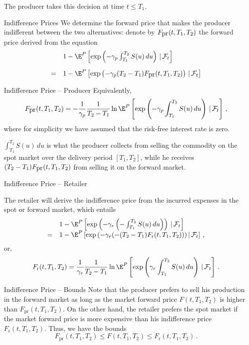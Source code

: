 The producer takes this decision at time $t\leq
T_1$.

{Indifference Prices}
We determine the forward price that makes the producer indifferent
between the two alternatives: denote by $F_{\hbox{pr}}(t,T_1,T_2)$
the forward price derived from the equation
$$
\begin{array}{ll}

& 1-\E^P\left[\exp\left(-\gamma_p\int_{T_1}^{T_2}S(u)\,du\right)\,|\,
\mathcal{F}_t\right]\\*[12pt]
= & 1-\E^P\left[\exp\left(-\gamma_p(T_2-T_1)F_{\hbox{pr}}(t,T_1,T_2)\right)\,|\,
\mathcal{F}_t\right]
\end{array}
$$

{Indifference Price -- Producer}
Equivalently,
\begin{equation}
\label{def-producer}
F_{\hbox{pr}}(t,T_1,T_2)=-\frac1{\gamma_p}\frac1{T_2-T_1}\ln\E^P
\left[\exp\left(-\gamma_p\int_{T_1}^{T_2}S(u)\,du\right)\,|\,
\mathcal{F}_t\right]\,,
\end{equation}
where for simplicity we have assumed that the risk-free interest
rate is zero.

$\int_{T_1}^{T_2}S(u)\,du$ is what the
producer collects from selling the commodity on the spot market
over the delivery period $[T_1,T_2]$, while he receives
$(T_2-T_1)F_{\hbox{pr}}(t,T_1,T_2)$ from selling it on the forward
market.

{Indifference Price -- Retailer}

The retailer will derive the indifference price from the incurred expenses
in the spot or forward market, which entails
$$
\begin{array}{ll}
&1-\E^P\left[\exp\left(-\gamma_r\left(-\int_{T_1}^{T_2}S(u)\,du\right)\right)
\,|\,\mathcal{F}_t\right]\\
= &1-\E^P\left[\exp\left(-\gamma_r(-(T_2-T_1)F_{\text{r}}(t,T_1,T_2)\right))\,|\,
\mathcal{F}_t\right]\,,
\end{array}
$$
or,
\begin{equation}
F_{\text{r}}(t,T_1,T_2)=\frac1{\gamma_r}\frac1{T_2-T_1}\ln\E^P\left[
\exp\left(\gamma_r\int_{T_1}^{T_2}S(u)\,du\right)\,|\,\mathcal{F}_t\right]\,.
\end{equation}

{Indifference Price -- Bounds}
Note that the producer prefers to sell his production in the forward
market as long as the market forward price $F(t,T_1,T_2)$ is higher
than $F_{\text{pr}}(t,T_1,T_2)$. On the other hand, the retailer
prefers the spot market if the market forward price is more
expensive than his indifference price $F_{\text{r}}(t,T_1,T_2)$.
Thus, we have the bounds
\begin{equation}\label{bounds for forward}
F_{\text{pr}}(t,T_1,T_2)\leq F(t,T_1,T_2)\leq
F_{\text{r}}(t,T_1,T_2)\,.
\end{equation}

